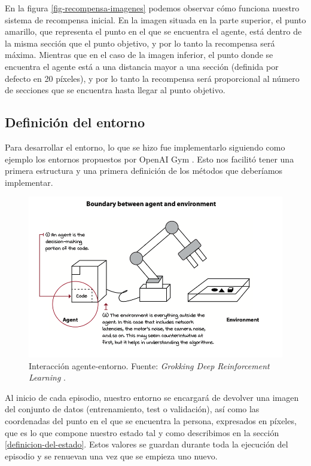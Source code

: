 En la figura \ref{fig-recompensa-imagenes} podemos observar cómo funciona nuestro sistema de recompensa inicial. En la imagen situada en la parte superior, el punto amarillo, que representa el punto en el que se encuentra el agente, está dentro de la misma sección que el punto objetivo, y por lo tanto la recompensa será máxima. Mientras que en el caso de la imagen inferior, el punto donde se encuentra el agente está a una distancia mayor a una sección (definida por defecto en 20 píxeles), y por lo tanto la recompensa será proporcional al número de secciones que se encuentra hasta llegar al punto objetivo.

\clearpage
\subsection{Definición del entorno}
\label{definicion-del-entorno}

Para desarrollar el entorno, lo que se hizo fue implementarlo siguiendo como ejemplo los entornos propuestos por OpenAI Gym \citep{openaigym}. Esto nos facilitó tener una primera estructura y una primera definición de los métodos que deberíamos implementar.
\medskip

\begin{figure}[ht!]
    \centering
    \includegraphics[width=1\textwidth]{figuras/agent_responsabilities.png}
    \caption[Interacción agente-entorno.]{Interacción agente-entorno. Fuente: \textit{Grokking Deep Reinforcement Learning} \citep{grokkingreinforcementlearning}.}
    \label{fig-agent-picture}
\end{figure}

Al inicio de cada episodio, nuestro entorno se encargará de devolver una imagen del conjunto de datos (entrenamiento, test o validación), así como las coordenadas del punto en el que se encuentra la persona, expresados en píxeles, que es lo que compone nuestro estado tal y como describimos en la sección \ref{definicion-del-estado}. Estos valores se guardan durante toda la ejecución del episodio y se renuevan una vez que se empieza uno nuevo.
\medskip

